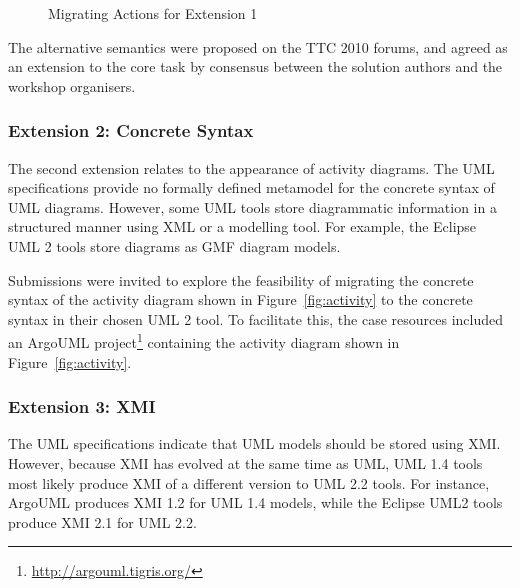 \begin{figure}[htbp]
	\centering
	\caption{Migrating Actions for Extension 1}
\label{fig:ofs_to_flow}
\end{figure}

The alternative semantics were proposed on the TTC 2010 forums, and agreed as an extension to the core task by consensus between the solution authors and the workshop organisers. 

\subsubsection{Extension 2: Concrete Syntax}
\label{sub:concrete_syntax}
The second extension relates to the appearance of activity diagrams. The UML specifications provide no formally defined metamodel for the concrete syntax of UML diagrams. However, some UML tools store diagrammatic information in a structured manner using XML or a modelling tool. For example, the Eclipse UML 2 tools \cite{mdt_uml2} store diagrams as GMF \cite{gronback09emp} diagram models.

Submissions were invited to explore the feasibility of migrating the concrete syntax of the activity diagram shown in Figure~\ref{fig:activity} to the concrete syntax in their chosen UML 2 tool. To facilitate this, the case resources included an ArgoUML project\footnote{\url{http://argouml.tigris.org/}} containing the activity diagram shown in Figure~\ref{fig:activity}.

\subsubsection{Extension 3: XMI}
\label{sub:xmi}
The UML specifications \cite{uml14,uml22} indicate that UML models should be stored using XMI. However, because XMI has evolved at the same time as UML, UML 1.4 tools most likely produce XMI of a different version to UML 2.2 tools. For instance, ArgoUML produces XMI 1.2 for UML 1.4 models, while the Eclipse UML2 tools produce XMI 2.1 for UML 2.2.

